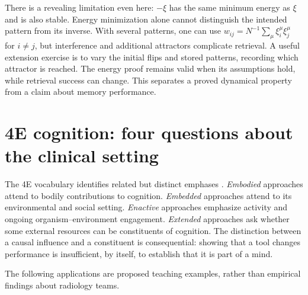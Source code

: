 There is a revealing limitation even here: $-\xi$ has the same minimum energy as $\xi$ and is also stable. Energy minimization alone cannot distinguish the intended pattern from its inverse. With several patterns, one can use $w_{ij}=N^{-1}\sum_\mu\xi_i^\mu\xi_j^\mu$ for $i\ne j$, but interference and additional attractors complicate retrieval. A useful extension exercise is to vary the initial flips and stored patterns, recording which attractor is reached. The energy proof remains valid when its assumptions hold, while retrieval success can change. This separates a proved dynamical property from a claim about memory performance.


\section{4E cognition: four questions about the clinical setting}\label{app:4e}
The 4E vocabulary identifies related but distinct emphases \citep{newen2018}. \emph{Embodied} approaches attend to bodily contributions to cognition. \emph{Embedded} approaches attend to its environmental and social setting. \emph{Enactive} approaches emphasize activity and ongoing organism--environment engagement. \emph{Extended} approaches ask whether some external resources can be constituents of cognition. The distinction between a causal influence and a constituent is consequential: showing that a tool changes performance is insufficient, by itself, to establish that it is part of a mind.

The following applications are proposed teaching examples, rather than empirical findings about radiology teams.

